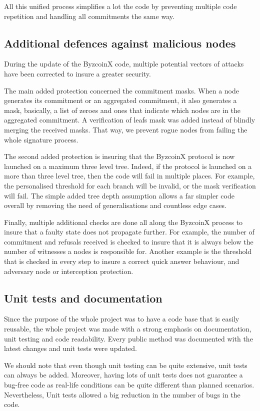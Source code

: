 \documentclass[11pt, a4paper, twoside, openright]{article}
\begin{document}
All this unified process simplifies a lot the code by preventing multiple code repetition and handling all commitments the same way.

\subsection{Additional defences against malicious nodes}
During the update of the ByzcoinX code, multiple potential vectors of attacks have been corrected to insure a greater security.

The main added protection concerned the commitment masks. When a node generates its commitment or an aggregated commitment, it also generates a mask, basically, a list of zeroes and ones that indicate which nodes are in the aggregated commitment. A verification of leafs mask was added instead of blindly merging the received masks. That way, we prevent rogue nodes from failing the whole signature process.

The second added protection is insuring that the ByzcoinX protocol is now launched on a maximum three level tree. Indeed, if the protocol is launched on a more than three level tree, then the code will fail in multiple places. For example, the personalised threshold for each branch will be invalid, or the mask verification will fail. The simple added tree depth assumption allows a far simpler code overall by removing the need of generalisations and countless edge cases.

Finally, multiple additional checks are done all along the ByzcoinX process to insure that a faulty state does not propagate further. For example, the number of commitment and refusals received is checked to insure that it is always below the number of witnesses a nodes is responsible for. Another example is the threshold that is checked in every step to insure a correct quick answer behaviour, and adversary node or interception protection.

\subsection{Unit tests and documentation}
Since the purpose of the whole project was to have a code base that is easily reusable, the whole project was made with a strong emphasis on documentation, unit testing and code readability. Every public method was documented with the latest changes and unit tests were updated.

We should note that even though unit testing can be quite extensive, unit tests can always be added. Moreover, having lots of unit tests does not guarantee a bug-free code as real-life conditions can be quite different than planned scenarios. Nevertheless, Unit tests allowed a big reduction in the number of bugs in the code.
\end{document}
